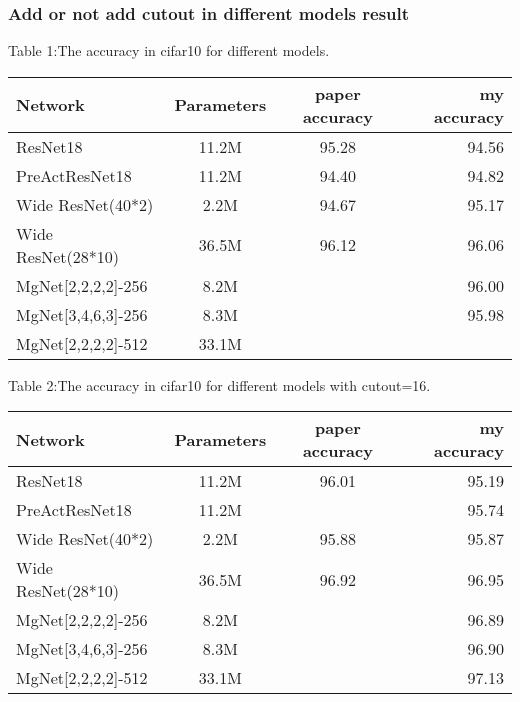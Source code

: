 \subsubsection{Add or not add cutout in different models result}
\quad
Table 1:The accuracy in cifar10 for different models.\\
\begin{tabular}{| l | c | c | r |}
	\hline
	Network                &     Parameters   &       paper accuracy   &   my accuracy     \\
	\hline
	ResNet18               &      11.2M      &          95.28         &     94.56          \\
	\hline
	PreActResNet18         &      11.2M      &          94.40         &     94.82          \\
	\hline
	Wide ResNet(40*2)      &      2.2M       &          94.67         &     95.17          \\
	\hline
	Wide ResNet(28*10)     &      36.5M      &          96.12         &     96.06          \\
	\hline
	MgNet[2,2,2,2]-256         &      8.2M       &                        &     96.00          \\
	\hline
	MgNet[3,4,6,3]-256         &      8.3M       &                        &     95.98          \\
	\hline
	MgNet[2,2,2,2]-512         &      33.1M       &                        &               \\
	\hline
\end{tabular}

\vbox{}
Table 2:The accuracy in cifar10 for different models with cutout=16.\\
\begin{tabular}{| l | c | c | r |}
	\hline
	Network                &     Parameters   &       paper accuracy   &   my accuracy     \\
	\hline
	ResNet18               &      11.2M      &          96.01         &     95.19          \\
	\hline
	PreActResNet18         &      11.2M      &                        &     95.74          \\
	\hline
	Wide ResNet(40*2)      &      2.2M       &          95.88         &     95.87          \\
	\hline
	Wide ResNet(28*10)     &      36.5M      &          96.92         &     96.95          \\
	\hline
	MgNet[2,2,2,2]-256         &      8.2M       &                        &     96.89          \\
	\hline
	MgNet[3,4,6,3]-256         &      8.3M       &                        &     96.90          \\
	\hline
	MgNet[2,2,2,2]-512         &      33.1M       &                        &    97.13          \\
	\hline
\end{tabular}


